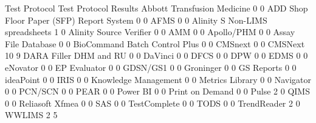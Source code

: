 \documentclass{article}
\begin{document}
\begin{Schunk}
\begin{Soutput}
                                           Test Protocol Test Protocol Results
  Abbott Transfusion Medicine                          0                     0
  ADD Shop Floor Paper (SFP) Report System             0                     0
  AFMS                                                 0                     0
  Alinity S Non-LIMS spreadsheets                      1                     0
  Alinity Source Verifier                              0                     0
  AMM                                                  0                     0
  Apollo/PHM                                           0                     0
  Assay File Database                                  0                     0
  BioCommand Batch Control Plus                        0                     0
  CMSnext                                              0                     0
  CMSNext                                             10                     9
  DARA Filler DHM and RU                               0                     0
  DaVinci                                              0                     0
  DFCS                                                 0                     0
  DPW                                                  0                     0
  EDMS                                                 0                     0
  eNovator                                             0                     0
  EP Evaluator                                         0                     0
  GDSN/GS1                                             0                     0
  Groninger                                            0                     0
  GS Reports                                           0                     0
  ideaPoint                                            0                     0
  IRIS                                                 0                     0
  Knowledge Management                                 0                     0
  Metrics Library                                      0                     0
  Navigator                                            0                     0
  PCN/SCN                                              0                     0
  PEAR                                                 0                     0
  Power BI                                             0                     0
  Print on Demand                                      0                     0
  Pulse                                                2                     0
  QIMS                                                 0                     0
  Reliasoft Xfmea                                      0                     0
  SAS                                                  0                     0
  TestComplete                                         0                     0
  TODS                                                 0                     0
  TrendReader                                          2                     0
  WWLIMS                                               2                     5


\end{Soutput}
\end{Schunk}
\end{document}

